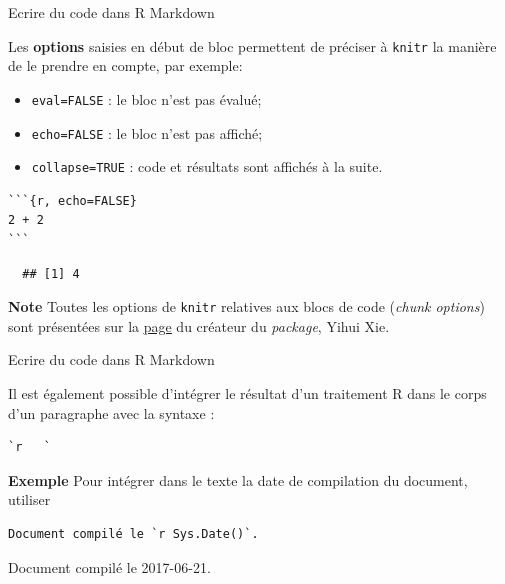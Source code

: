\documentclass[12pt,ignorenonframetext,]{beamer}
\providecommand{\tightlist}{%
\setlength{\itemsep}{0pt}\setlength{\parskip}{0pt}}
\begin{document}
\begin{frame}[fragile]{Ecrire du code dans R Markdown}

Les \textbf{options} saisies en début de bloc permettent de préciser à
\texttt{knitr} la manière de le prendre en compte, par exemple:

\begin{itemize}
\tightlist
\item
  \texttt{eval=FALSE} : le bloc n'est pas évalué;
\item
  \texttt{echo=FALSE} : le bloc n'est pas affiché;
\item
  \texttt{collapse=TRUE} : code et résultats sont affichés à la suite.
\end{itemize}

\pause 

\begin{verbatim}
```{r, echo=FALSE}
2 + 2
```
\end{verbatim}

\begin{verbatim}
  ## [1] 4
\end{verbatim}

\pause 

\textbf{Note} Toutes les options de \texttt{knitr} relatives aux blocs
de code (\emph{chunk options}) sont présentées sur la
\href{http://yihui.name/knitr/options/}{\underline{page}} du créateur du
\emph{package}, Yihui Xie.

\end{frame}

\begin{frame}[fragile]{Ecrire du code dans R Markdown}

Il est également possible d'intégrer le résultat d'un traitement R dans
le corps d'un paragraphe avec la syntaxe :

\begin{verbatim}
`r   `
\end{verbatim}

\pause 

\textbf{Exemple} Pour intégrer dans le texte la date de compilation du
document, utiliser

\begin{verbatim}
Document compilé le `r Sys.Date()`.
\end{verbatim}

\pause Document compilé le 2017-06-21.

\end{frame}
\end{document}
